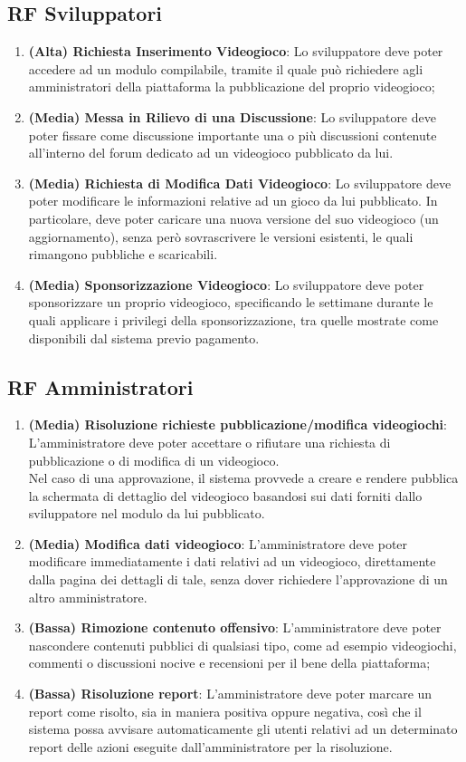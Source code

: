 \subsection{RF Sviluppatori}
\begin{enumerate}
	\item \textbf{(Alta) Richiesta Inserimento Videogioco}: Lo sviluppatore deve poter accedere ad un modulo compilabile, tramite il quale può richiedere agli amministratori della piattaforma la pubblicazione del proprio videogioco;
	\item \textbf{(Media) Messa in Rilievo di una Discussione}: Lo sviluppatore deve poter fissare come discussione importante una o più discussioni contenute all’interno del forum dedicato ad un videogioco pubblicato da lui.
	\item \textbf{(Media) Richiesta di Modifica Dati Videogioco}: Lo sviluppatore deve poter modificare le informazioni relative ad un gioco da lui pubblicato. In particolare, deve poter caricare una nuova versione del suo videogioco (un aggiornamento), senza però sovrascrivere le versioni esistenti, le quali rimangono pubbliche e scaricabili.
	\item \textbf{(Media) Sponsorizzazione Videogioco}: Lo sviluppatore deve poter sponsorizzare un proprio videogioco, specificando le settimane durante le quali applicare i privilegi della sponsorizzazione, tra quelle mostrate come disponibili dal sistema previo pagamento.	
\end{enumerate}

\subsection{RF Amministratori}
\begin{enumerate}
	\item \textbf{(Media) Risoluzione richieste pubblicazione/modifica videogiochi}: L’amministratore deve poter accettare o rifiutare una richiesta di pubblicazione o di modifica di un videogioco.
	\\Nel caso di una approvazione, il sistema provvede a creare e rendere pubblica la schermata di dettaglio del videogioco basandosi sui dati forniti dallo sviluppatore nel modulo da lui pubblicato.
	\item \textbf{(Media) Modifica dati videogioco}: L’amministratore deve poter modificare immediatamente i dati relativi ad un videogioco, direttamente dalla pagina dei dettagli di tale, senza dover richiedere l’approvazione di un altro amministratore.
	\item \textbf{(Bassa) Rimozione contenuto offensivo}: L’amministratore deve poter nascondere contenuti pubblici di qualsiasi tipo, come ad esempio videogiochi, commenti o discussioni nocive e recensioni per il bene della piattaforma;
	\item \textbf{(Bassa) Risoluzione report}: L’amministratore deve poter marcare un report come risolto, sia in maniera positiva oppure negativa, così che il sistema possa avvisare automaticamente gli utenti relativi ad un determinato report delle azioni eseguite dall’amministratore per la risoluzione.	
\end{enumerate}

